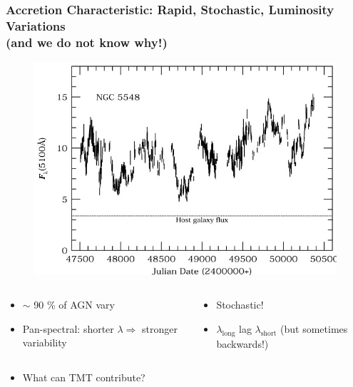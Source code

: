 \documentclass[hyperref={pdfpagelabels=false}]{beamer}
\begin{document}
\begin{frame}
\frametitle{Accretion Characteristic: Rapid, Stochastic, Luminosity Variations\\(and we do not know why!)}
  \begin{figure}
    \includegraphics[scale=0.2]{images/NGC5548_Variability.jpg}
  \end{figure}
  \centering
    {\tiny \citep{Peterson99}}
  \begin{columns}
  \centering
    \begin{column}{0.5\textwidth}
      \begin{itemize}
        \item {\scriptsize $\sim$ 90 \% of AGN vary {\tiny \citep{Sesar07}}}
        \item {\scriptsize Pan-spectral: shorter $\lambda \Rightarrow$ stronger variability}
      \end{itemize}
    \end{column}
    \begin{column}{0.5\textwidth}
      \begin{itemize}
        \item {\scriptsize Stochastic! {\tiny \citep{Peterson}}}
        \item {\scriptsize $\lambda_{\mathrm{long}}$ lag $\lambda_{\mathrm{short}}$ (but sometimes backwards!)}
      \end{itemize}
    \end{column}
  \end{columns}
  \begin{itemize}
    \centering
    \item {\small What can TMT contribute?}
  \end{itemize}
\end{frame}
\end{document}
